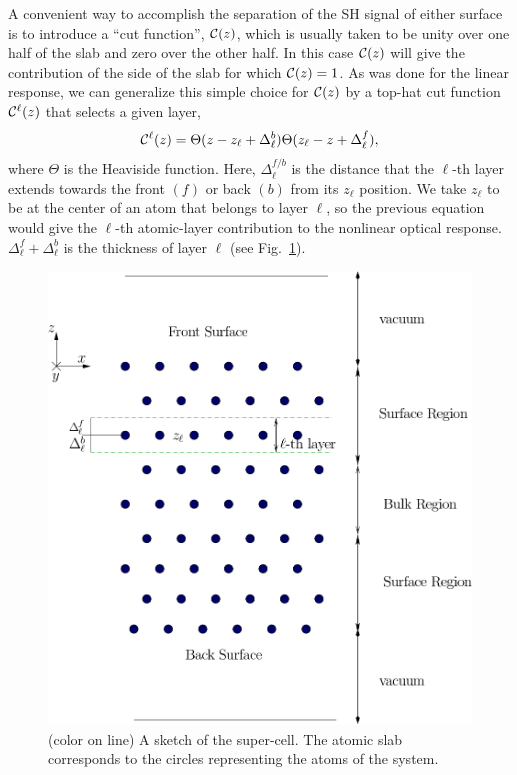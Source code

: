 \documentclass[floatfix,prb,aps,superscriptaddress,showpacs,11pt,preprint,letterpaper]{revtex4}
\begin{document}
A convenient way to accomplish the separation of the SH signal of
either surface is to introduce a ``cut function'', ${\mathbf{\cal C}}(z)$, which is 
usually taken to be unity over one half of the slab and zero over 
the other half.\cite{reiningPRB94}
In this case ${\mathbf{\cal C}}(z)$ will give the contribution of the 
side of the slab for which ${\mathbf{\cal C}}(z)=1$. 
As was done for the linear response,\cite{mendozaPRB06}
we can generalize this 
simple choice for ${\mathbf{\cal C}}(z)$ by a top-hat cut function
${\mathbf{\cal C}}^\ell(z)$ that selects a given layer,
\begin{equation}
{\mathbf{\cal C}}^\ell(z)=\Theta(z-z_\ell+\Delta_\ell^{b})  
            \Theta(z_\ell-z+\Delta_\ell^f),
\label{sz}
\end{equation} 
where $\Theta$ is the Heaviside function. Here, $\Delta_\ell^{f/b}$
is the distance that the $\ell$-th layer extends towards the front
$(f)$ or back $(b)$ from its $z_\ell$ position. 
We take $z_\ell$ to be at the center of an atom that 
belongs to layer $\ell$, so the previous
equation would give the $\ell$-th atomic-layer 
contribution to the nonlinear optical response.
$\Delta_\ell^f+\Delta_\ell^b$ is the thickness of layer $\ell$ 
(see Fig.~\ref{fslab}).
\begin{figure}
\centering
\includegraphics[scale=.7]{images/slab}
\caption{(color on line) A sketch of the super-cell. 
The atomic slab corresponds to the
circles representing the atoms of the system.
\label{fslab}} 
\end{figure}
\end{document}
